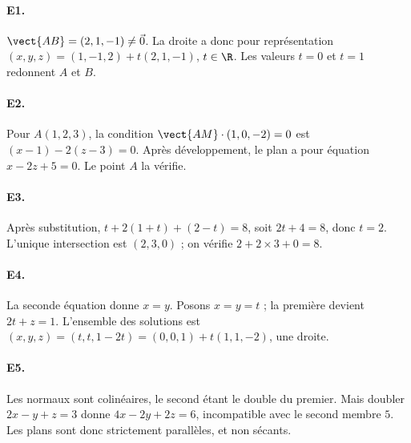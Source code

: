 \paragraph{E1.}$\vect{AB}=(2,1,-1)\ne\vec0$. La droite a donc pour représentation $(x,y,z)=(1,-1,2)+t(2,1,-1)$, $t\in\R$. Les valeurs $t=0$ et $t=1$ redonnent $A$ et $B$.

\paragraph{E2.}Pour $A(1,2,3)$, la condition $\vect{AM}\cdot(1,0,-2)=0$ est $(x-1)-2(z-3)=0$. Après développement, le plan a pour équation $x-2z+5=0$. Le point $A$ la vérifie.

\paragraph{E3.}Après substitution, $t+2(1+t)+(2-t)=8$, soit $2t+4=8$, donc $t=2$. L'unique intersection est $(2,3,0)$ ; on vérifie $2+2\times3+0=8$.

\paragraph{E4.}La seconde équation donne $x=y$. Posons $x=y=t$ ; la première devient $2t+z=1$. L'ensemble des solutions est $(x,y,z)=(t,t,1-2t)=(0,0,1)+t(1,1,-2)$, une droite.

\paragraph{E5.}Les normaux sont colinéaires, le second étant le double du premier. Mais doubler $2x-y+z=3$ donne $4x-2y+2z=6$, incompatible avec le second membre $5$. Les plans sont donc strictement parallèles, et non sécants.


